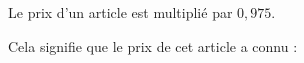 
Le prix d'un article est multiplié par $0{,}975$.

Cela signifie que le prix de cet article a connu :

\smallskip

